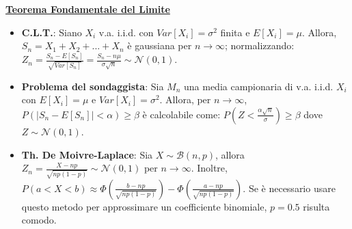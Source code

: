 \documentclass[8pt]{extarticle}
\begin{document}
\begin{multicols*}{3}
    \textbf{\underline{Teorema Fondamentale del Limite}}
    \begin{itemize}
        \item \textbf{C.L.T.}: Siano $X_{i}$ v.a. i.i.d. con $Var[X_{i}]=\sigma^{2}$ finita e $E[X_{i}]=\mu$. Allora, $S_{n}=X_{1}+X_{2}+...+X_{n}$ è gaussiana per $n\rightarrow\infty$; normalizzando: $Z_{n}=\frac{S_{n}-E[S_{n}]}{\sqrt{Var[S_{n}]}}=\frac{S_{n}-n\mu}{\sigma\sqrt{n}}\sim\mathcal{N}(0,1)$.
        \item \textbf{Problema del sondaggista}: Sia $M_{n}$ una media campionaria di v.a. i.i.d. $X_{i}$ con $E[X_{i}]=\mu$ e $Var[X_{i}]=\sigma^{2}$. Allora, per $n\rightarrow\infty$, $P(|S_{n}-E[S_{n}]|<\alpha)\ge\beta$ è calcolabile come: $P\left(Z<\frac{\alpha\sqrt{n}}{\sigma}\right)\ge\beta$ dove $Z\sim\mathcal{N}(0,1)$.
        \item \textbf{Th. De Moivre-Laplace}: Sia $X\sim\mathcal{B}(n,p)$, allora $Z_{n}=\frac{X-np}{\sqrt{np(1-p)}}\sim\mathcal{N}(0,1)$ per $n\rightarrow\infty$. Inoltre, $P(a<X<b)\approx\Phi\left(\frac{b-np}{\sqrt{np(1-p)}}\right)-\Phi\left(\frac{a-np}{\sqrt{np(1-p)}}\right)$. Se è necessario usare questo metodo per approssimare un coefficiente binomiale, $p=0.5$ risulta comodo.
    \end{itemize}


\end{multicols*}
\end{document}
